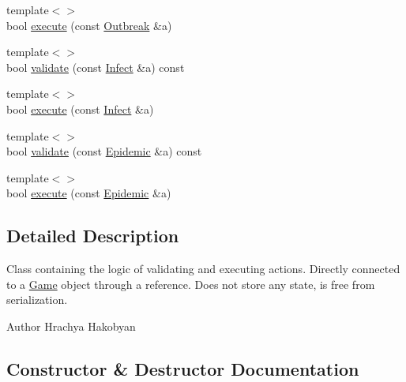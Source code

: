 \begin{DoxyCompactItemize}
\item 
{\footnotesize template$<$$>$ }\\bool \hyperlink{classpan_1_1_action_handler_ad2119c276b50e56a42553671fc6e1e70}{execute} (const \hyperlink{classpan_1_1_outbreak}{Outbreak} \&a)
\item 
{\footnotesize template$<$$>$ }\\bool \hyperlink{classpan_1_1_action_handler_a0dc0214533aeb931e6c119e15caaee6a}{validate} (const \hyperlink{classpan_1_1_infect}{Infect} \&a) const
\item 
{\footnotesize template$<$$>$ }\\bool \hyperlink{classpan_1_1_action_handler_ade755aaadb764489a68634811314bee2}{execute} (const \hyperlink{classpan_1_1_infect}{Infect} \&a)
\item 
{\footnotesize template$<$$>$ }\\bool \hyperlink{classpan_1_1_action_handler_a28ed770b339cba18d970a153c82d3c45}{validate} (const \hyperlink{classpan_1_1_epidemic}{Epidemic} \&a) const
\item 
{\footnotesize template$<$$>$ }\\bool \hyperlink{classpan_1_1_action_handler_a469f04bd874aca38c9b3792aee209703}{execute} (const \hyperlink{classpan_1_1_epidemic}{Epidemic} \&a)
\end{DoxyCompactItemize}


\subsection{Detailed Description}
Class containing the logic of validating and executing actions. Directly connected to a \hyperlink{classpan_1_1_game}{Game} object through a reference. Does not store any state, is free from serialization. 

\begin{DoxyAuthor}{Author}
Hrachya Hakobyan 
\end{DoxyAuthor}


\subsection{Constructor \& Destructor Documentation}
\mbox{\label{classpan_1_1_action_handler_a5aeb269dae11a6bd190fafd945a508a1}} 
